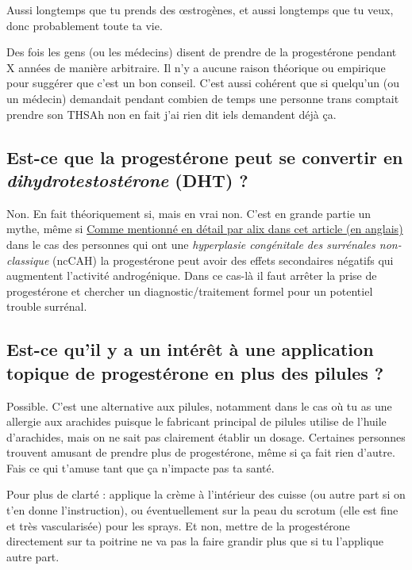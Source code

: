 \documentclass{article}
\begin{document}
Aussi longtemps que tu prends des œstrogènes, et aussi longtemps que tu veux, donc probablement toute ta vie.

Des fois les gens (ou les médecins) disent de prendre de la progestérone pendant X années de manière arbitraire. Il n'y a aucune raison théorique ou empirique pour suggérer que c'est un bon conseil. C'est aussi cohérent que si quelqu'un (ou un médecin) demandait pendant combien de temps une personne trans comptait prendre son THS\textemdash{}Ah non en fait j'ai rien dit iels demandent déjà ça. 

\subsection{Est-ce que la progestérone peut se convertir en \textit{dihydrotestostérone} (DHT) ?}

Non. En fait théoriquement si, mais en vrai non. C'est en grande partie un mythe, même si \href{https://whsah.co/posts/rethinking-progesterone-and-androgens/}{Comme mentionné en détail par alix dans cet article (en anglais)} dans le cas des personnes qui ont une \textit{hyperplasie congénitale des surrénales non-classique} (ncCAH) la progestérone peut avoir des effets secondaires négatifs qui augmentent l'activité androgénique. Dans ce cas-là il faut arrêter la prise de progestérone et chercher un diagnostic/traitement formel pour un potentiel trouble surrénal.

\subsection{Est-ce qu'il y a un intérêt à une application topique de progestérone en plus des pilules ?}

Possible. C'est une alternative aux pilules, notamment dans le cas où tu as une allergie aux arachides puisque le fabricant principal de pilules utilise de l'huile d'arachides, mais on ne sait pas clairement établir un dosage. Certaines personnes trouvent amusant de prendre plus de progestérone, même si ça fait rien d'autre. Fais ce qui t'amuse tant que ça n'impacte pas ta santé.

Pour plus de clarté : applique la crème à l'intérieur des cuisse (ou autre part si on t'en donne l'instruction), ou éventuellement sur la peau du scrotum (elle est fine et très vascularisée) pour les sprays. Et non, mettre de la progestérone directement sur ta poitrine ne va pas la faire grandir plus que si tu l'applique autre part.
\end{document}
